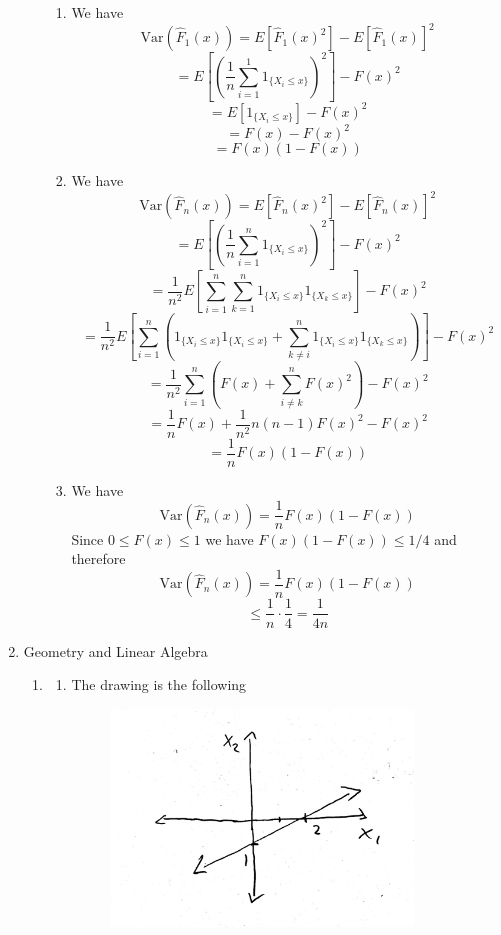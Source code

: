 \documentclass[submit]{harvardml}
\begin{document}
\begin{enumerate}
\begin{enumerate}
\begin{enumerate}
      \item
      We have
      $$\mathrm{Var}(\hat{F}_1(x)) = E[\hat{F}_1(x)^2] - E[\hat{F}_1(x)]^2$$
      $$= E\left[\left(\frac{1}{n} \sum_{i=1}^1 1_{\{X_i\leq x\}}\right)^2\right] - F(x)^2$$
      $$= E\left[1_{\{X_i\leq x\}}\right] - F(x)^2$$
      $$= F(x) - F(x)^2$$
      $$= F(x)(1-F(x))$$

      \item
      We have
      $$\mathrm{Var}(\hat{F}_n(x)) = E[\hat{F}_n(x)^2] - E[\hat{F}_n(x)]^2$$
      $$= E\left[\left(\frac{1}{n} \sum_{i=1}^n 1_{\{X_i\leq x\}}\right)^2\right] - F(x)^2$$
      $$= \frac{1}{n^2} E\left[\sum_{i=1}^n \sum_{k=1}^n 1_{\{X_i\leq x\}} 1_{\{X_k\leq x\}} \right] - F(x)^2$$
      $$= \frac{1}{n^2} E\left[\sum_{i=1}^n \left( 1_{\{X_i\leq x\}} 1_{\{X_i\leq x\}} + \sum_{k\neq i}^n 1_{\{X_i\leq x\}} 1_{\{X_k\leq x\}} \right) \right] - F(x)^2$$
      $$= \frac{1}{n^2} \sum_{i=1}^n \left( F(x) + \sum_{i\neq k}^n F(x)^2 \right) - F(x)^2$$
      $$= \frac{1}{n} F(x) + \frac{1}{n^2} n (n-1) F(x)^2 - F(x)^2$$
      $$= \frac{1}{n} F(x)(1-F(x))$$

      \item
      We have 
      $$\mathrm{Var}(\hat{F}_n(x))  = \frac{1}{n} F(x)(1-F(x)) $$
      Since $0\leq F(x)\leq 1$ we have $F(x)(1-F(x)) \leq 1/4$ and therefore
      $$\mathrm{Var}(\hat{F}_n(x))  = \frac{1}{n} F(x)(1-F(x))$$
      $$ \leq \frac{1}{n}\cdot\frac{1}{4} = \frac{1}{4n} $$
    \end{enumerate}
  \end{enumerate}

\item Geometry and Linear Algebra
\begin{enumerate}
  \item
  \begin{enumerate}
    \item 
    The drawing is the following
    \begin{figure}[h]
    \includegraphics[width=8cm]{5.1.a}
    \centering
    \end{figure}


\end{enumerate}
\end{enumerate}
\end{enumerate}
\end{document}
